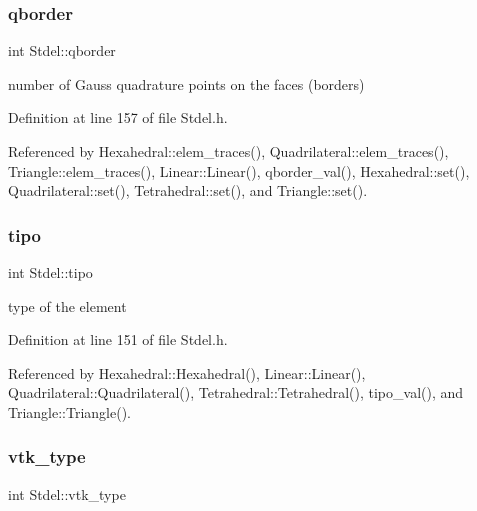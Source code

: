 \mbox{\label{classStdel_a63a106b928d211c71d5fec6449ef4d51}} 
\subsubsection{\texorpdfstring{qborder}{qborder}}
{\footnotesize\ttfamily int Stdel\+::qborder\hspace{0.3cm}{\ttfamily [protected]}}



number of Gauss quadrature points on the faces (borders) 



Definition at line 157 of file Stdel.\+h.



Referenced by Hexahedral\+::elem\+\_\+traces(), Quadrilateral\+::elem\+\_\+traces(), Triangle\+::elem\+\_\+traces(), Linear\+::\+Linear(), qborder\+\_\+val(), Hexahedral\+::set(), Quadrilateral\+::set(), Tetrahedral\+::set(), and Triangle\+::set().

\mbox{\label{classStdel_a68f8781a42728758ccde39e15cd319ed}} 
\subsubsection{\texorpdfstring{tipo}{tipo}}
{\footnotesize\ttfamily int Stdel\+::tipo\hspace{0.3cm}{\ttfamily [protected]}}



type of the element 



Definition at line 151 of file Stdel.\+h.



Referenced by Hexahedral\+::\+Hexahedral(), Linear\+::\+Linear(), Quadrilateral\+::\+Quadrilateral(), Tetrahedral\+::\+Tetrahedral(), tipo\+\_\+val(), and Triangle\+::\+Triangle().

\mbox{\label{classStdel_a55624584790a08437c03540489d04898}} 
\subsubsection{\texorpdfstring{vtk\+\_\+type}{vtk\_type}}
{\footnotesize\ttfamily int Stdel\+::vtk\+\_\+type\hspace{0.3cm}{\ttfamily [protected]}}



